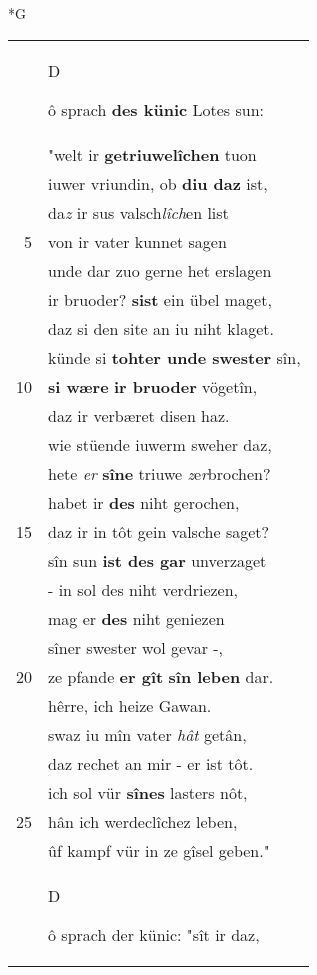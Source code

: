 \documentclass[8pt,a4paper,notitlepage]{article}
\begin{document}
\begin{table}[ht]
\begin{minipage}[t]{0.5\linewidth}
\small
\begin{center}*G
\end{center}
\begin{tabular}{rl}
 & \begin{large}D\end{large}ô sprach \textbf{des künic} Lotes sun:\\ 
 & "welt ir \textbf{getriuwelîchen} tuon\\ 
 & iuwer vriundin, ob \textbf{diu daz} ist,\\ 
 & da\textit{z} ir sus valsch\textit{lîch}en list\\ 
5 & von ir vater kunnet sagen\\ 
 & unde dar zuo gerne het erslagen\\ 
 & ir bruoder? \textbf{sist} ein übel maget,\\ 
 & daz si den site an iu niht klaget.\\ 
 & künde si \textbf{tohter unde swester} sîn,\\ 
10 & \textbf{si wære} \textbf{ir bruoder} vögetîn,\\ 
 & daz ir verbæret disen haz.\\ 
 & wie stüende iuwerm sweher daz,\\ 
 & hete \textit{er} \textbf{sîne} triuwe \textit{z}e\textit{r}brochen?\\ 
 & habet ir \textbf{des} niht gerochen,\\ 
15 & daz ir in tôt gein valsche saget?\\ 
 & sîn sun \textbf{ist des gar} unverzaget\\ 
 & - in sol des niht verdriezen,\\ 
 & mag er \textbf{des} niht geniezen\\ 
 & sîner swester wol gevar -,\\ 
20 & ze pfande \textbf{er gît} \textbf{sîn leben} dar.\\ 
 & hêrre, ich heize Gawan.\\ 
 & swaz iu mîn vater \textit{hât} getân,\\ 
 & daz rechet an mir - er ist tôt.\\ 
 & ich sol vür \textbf{sînes} lasters nôt,\\ 
25 & hân ich werdeclîchez leben,\\ 
 & ûf kampf vür in ze gîsel geben."\\ 
 & \begin{large}D\end{large}ô sprach der künic: "sît ir daz,\\ 

\end{tabular}
\end{minipage}
\end{table}
\end{document}
